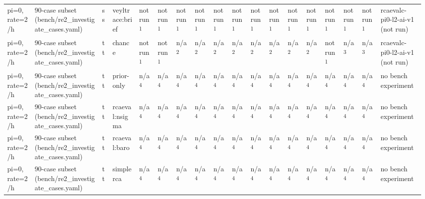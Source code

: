 \begin{table}[t]
\begin{tabular}{llllllllllllllllll}
pi=0, rate=2/h & 90-case subset (bench/re2\_investigate\_cases.yaml) & ss & veyltrace:brief & not run\textsuperscript{1} & not run\textsuperscript{1} & not run\textsuperscript{1} & not run\textsuperscript{1} & not run\textsuperscript{1} & not run\textsuperscript{1} & not run\textsuperscript{1} & not run\textsuperscript{1} & not run\textsuperscript{1} & not run\textsuperscript{1} & not run\textsuperscript{1} & not run\textsuperscript{1} & not run\textsuperscript{1} & rcaevalc-pi0-l2-ai-v1 (not run) \\
pi=0, rate=2/h & 90-case subset (bench/re2\_investigate\_cases.yaml) & tt & chance & not run\textsuperscript{1} & not run\textsuperscript{1} & n/a\textsuperscript{2} & n/a\textsuperscript{2} & n/a\textsuperscript{2} & n/a\textsuperscript{2} & n/a\textsuperscript{2} & n/a\textsuperscript{2} & n/a\textsuperscript{2} & n/a\textsuperscript{2} & not run\textsuperscript{1} & n/a\textsuperscript{3} & n/a\textsuperscript{3} & rcaevalc-pi0-l2-ai-v1 (not run) \\
pi=0, rate=2/h & 90-case subset (bench/re2\_investigate\_cases.yaml) & tt & prior-only & n/a\textsuperscript{4} & n/a\textsuperscript{4} & n/a\textsuperscript{4} & n/a\textsuperscript{4} & n/a\textsuperscript{4} & n/a\textsuperscript{4} & n/a\textsuperscript{4} & n/a\textsuperscript{4} & n/a\textsuperscript{4} & n/a\textsuperscript{4} & n/a\textsuperscript{4} & n/a\textsuperscript{4} & n/a\textsuperscript{4} & no bench experiment \\
pi=0, rate=2/h & 90-case subset (bench/re2\_investigate\_cases.yaml) & tt & rcaeval:nsigma & n/a\textsuperscript{4} & n/a\textsuperscript{4} & n/a\textsuperscript{4} & n/a\textsuperscript{4} & n/a\textsuperscript{4} & n/a\textsuperscript{4} & n/a\textsuperscript{4} & n/a\textsuperscript{4} & n/a\textsuperscript{4} & n/a\textsuperscript{4} & n/a\textsuperscript{4} & n/a\textsuperscript{4} & n/a\textsuperscript{4} & no bench experiment \\
pi=0, rate=2/h & 90-case subset (bench/re2\_investigate\_cases.yaml) & tt & rcaeval:baro & n/a\textsuperscript{4} & n/a\textsuperscript{4} & n/a\textsuperscript{4} & n/a\textsuperscript{4} & n/a\textsuperscript{4} & n/a\textsuperscript{4} & n/a\textsuperscript{4} & n/a\textsuperscript{4} & n/a\textsuperscript{4} & n/a\textsuperscript{4} & n/a\textsuperscript{4} & n/a\textsuperscript{4} & n/a\textsuperscript{4} & no bench experiment \\
pi=0, rate=2/h & 90-case subset (bench/re2\_investigate\_cases.yaml) & tt & simplerca & n/a\textsuperscript{4} & n/a\textsuperscript{4} & n/a\textsuperscript{4} & n/a\textsuperscript{4} & n/a\textsuperscript{4} & n/a\textsuperscript{4} & n/a\textsuperscript{4} & n/a\textsuperscript{4} & n/a\textsuperscript{4} & n/a\textsuperscript{4} & n/a\textsuperscript{4} & n/a\textsuperscript{4} & n/a\textsuperscript{4} & no bench experiment \\

\end{tabular}
\end{table}
